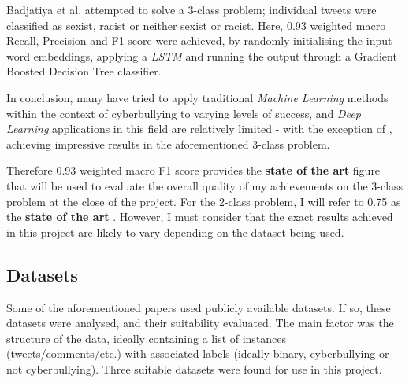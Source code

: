\documentclass[12pt,a4paper]{article}
\begin{document}
Badjatiya et al. \cite{Badjatiya} attempted to solve a 3-class problem; individual tweets were classified as sexist, racist or neither sexist or racist. Here, 0.93 weighted macro Recall, Precision and F1 score were achieved, by randomly initialising the input word embeddings, applying a \textit{LSTM} and running the output through a Gradient Boosted Decision Tree classifier. 

In conclusion, many have tried to apply traditional \textit{Machine Learning} methods within the context of cyberbullying to varying levels of success, and \textit{Deep Learning} applications in this field are relatively limited - with the exception of \cite{Badjatiya}, achieving impressive results in the aforementioned 3-class problem. 

Therefore 0.93 weighted macro F1 score provides the \textbf{state of the art} figure that will be used to evaluate the overall quality of my achievements on the 3-class problem at the close of the project. For the 2-class problem, I will refer to 0.75 as the \textbf{state of the art} \cite{Hack}. However, I must consider that the exact results achieved in this project are likely to vary depending on the dataset being used.


\subsection{Datasets}
Some of the aforementioned papers used publicly available datasets. If so, these datasets were analysed, and their suitability evaluated. The main factor was the structure of the data, ideally containing a list of instances (tweets/comments/etc.) with associated labels (ideally binary, cyberbullying or not cyberbullying). Three suitable datasets were found for use in this project.
\end{document}
